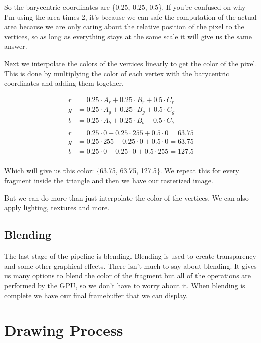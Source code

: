\documentclass[12pt]{report} \usepackage{preamble}
\begin{document}
So the barycentric coordinates are \{0.25, 0.25, 0.5\}.
If you're confused on why I'm using the area times 2, it's because we can safe the
computation of the actual area because we are only caring about
the relative position of the pixel to the vertices, so as long as everything stays
at the same scale it will give us the same answer.

Next we interpolate the colors of the vertices linearly to get the color of the pixel.
This is done by multiplying the color of each vertex
with the barycentric coordinates and adding them together.

\[
	\begin{aligned}
		r & = 0.25 \cdot A_r + 0.25 \cdot B_r + 0.5 \cdot C_r     \\
		g & = 0.25 \cdot A_g + 0.25 \cdot B_g + 0.5 \cdot C_g     \\
		b & = 0.25 \cdot A_b + 0.25 \cdot B_b + 0.5 \cdot C_b     \\
		\\
		r & = 0.25 \cdot 0 + 0.25 \cdot 255 + 0.5 \cdot 0 = 63.75 \\
		g & = 0.25 \cdot 255 + 0.25 \cdot 0 + 0.5 \cdot 0 = 63.75 \\
		b & = 0.25 \cdot 0 + 0.25 \cdot 0 + 0.5 \cdot 255 = 127.5 \\
	\end{aligned}
\]

Which will give us this color: \{63.75, 63.75, 127.5\}.
We repeat this for every fragment inside the triangle and then we have our rasterized image.

But we can do more than just interpolate the color of the vertices.
We can also apply lighting, textures and more.

\subsection{Blending}

The last stage of the pipeline is blending. Blending is used to create transparency
and some other graphical effects. There isn't much to say about blending.
It gives us many options to blend the color of the fragment but all of the operations are
performed by the GPU, so we don't have to worry about it.
When blending is complete we have our final framebuffer that we can display.

\section{Drawing Process}
\end{document}
